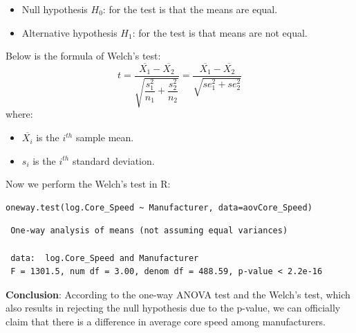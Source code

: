 \documentclass[a4paper]{article}
\begin{document}
\begin{itemize}
    \item Null hypothesis $H_0$: for the test is that the means are equal.
    \item Alternative hypothesis $H_1$: for the test is that means are not equal.
\end{itemize}
Below is the formula of Welch’s test:
\begin{equation*}
    t = \dfrac{\overline{X_1}-\overline{X_2}}{\sqrt{\dfrac{s^2_1}{n_1}+\dfrac{s^2_2}{n_2}}}=\dfrac{\overline{X_1}-\overline{X_2}}{\sqrt{se^2_1+se^2_2}}
\end{equation*}
where:
\begin{itemize}
    \item $\overline{X_i}$ is the $i^{th}$ sample mean.
    \item $s_i$ is the $i^{th}$ standard deviation.
\end{itemize}
Now we perform the Welch’s test in R:
\begin{mdframed}[leftline=false,rightline=false,backgroundcolor=lightblue!10,nobreak=false]
    \begin{verbatim}
oneway.test(log.Core_Speed ~ Manufacturer, data=aovCore_Speed)
    \end{verbatim}
\end{mdframed}
\begin{lstlisting}
 One-way analysis of means (not assuming equal variances)

 data:  log.Core_Speed and Manufacturer
 F = 1301.5, num df = 3.00, denom df = 488.59, p-value < 2.2e-16
\end{lstlisting}
\bigskip
\textbf{Conclusion}:
According to the one-way ANOVA test and the Welch’s test, which also results in rejecting the null
hypothesis due to the p-value, we can officially claim that there is a difference in average core speed among manufacturers.
\end{document}
